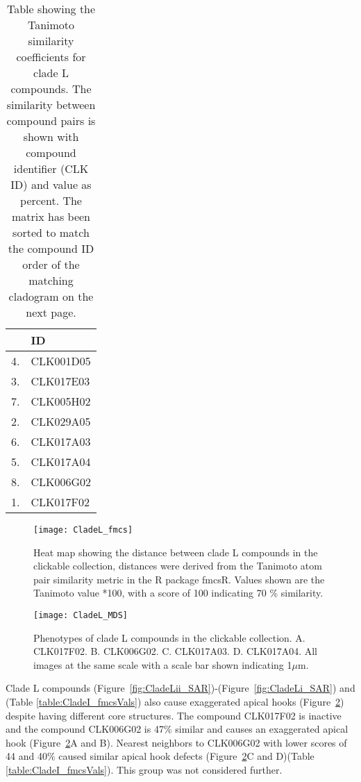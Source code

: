 \begin{table}\centering
    \begin{tabular}{|l|l|}
    \hline
    & ID \\ \hline
4. & CLK001D05  \\ \hline
3. & CLK017E03  \\ \hline
7. & CLK005H02  \\ \hline
2. & CLK029A05  \\ \hline
6. & CLK017A03  \\ \hline
5. & CLK017A04  \\ \hline
8. & CLK006G02  \\ \hline
1. & CLK017F02  \\ \hline
    \end{tabular}
    \caption {Table showing the Tanimoto similarity coefficients for clade L compounds. The similarity between compound pairs is shown with compound identifier (CLK ID) and value as percent. The matrix has been sorted to match the compound ID order of the matching cladogram on the next page.}     
     \label{table:CladeL_fmcsVals}
\end{table}

\begin{figure}\centering
\texttt{[image: CladeL\_fmcs]}
\caption{Heat map showing the distance between clade L compounds in the clickable collection, distances were derived from the Tanimoto atom pair similarity metric in the R package fmcsR. Values shown are the Tanimoto value *100, with a score of 100 indicating 70 {\%} similarity.}
\label{fig:CladeL_fmcs}
\end{figure}

\begin{figure}
\centering
\texttt{[image: CladeL\_MDS]}
\caption{Phenotypes of clade L compounds in the clickable collection. A. CLK017F02. B. CLK006G02. C. CLK017A03. D. CLK017A04. All images at the same scale with a scale bar shown indicating 1$\mu$m.}
\label{fig:CladeL_MDS}
\end{figure}


Clade L compounds (Figure~\ref{fig:CladeLii_SAR})-(Figure~\ref{fig:CladeLi_SAR}) and (Table \ref{table:CladeI_fmcsVals}) also cause exaggerated apical hooks (Figure~\ref{fig:CladeL_MDS}) despite having different core structures. The compound CLK017F02 is inactive and the compound CLK006G02 is 47{\%} similar and causes an exaggerated apical hook (Figure~\ref{fig:CladeL_MDS}A and B). Nearest neighbors to CLK006G02 with lower scores of 44 and 40{\%} caused similar apical hook defects (Figure~\ref{fig:CladeL_MDS}C and D)(Table \ref{table:CladeI_fmcsVals}). This group was not considered further.

